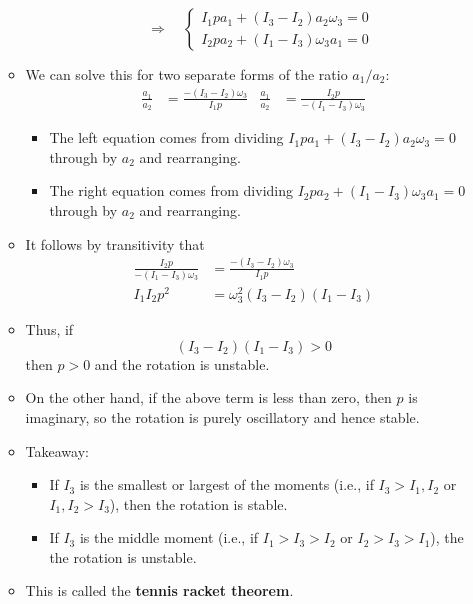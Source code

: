 \documentclass[../notes.tex]{subfiles}
\begin{document}
\begin{itemize}
\begin{itemize}
\begin{equation*}
            \quad\Longrightarrow\quad
            \begin{cases}
                I_1pa_1+(I_3-I_2)a_2\omega_3 = 0\\
                I_2pa_2+(I_1-I_3)\omega_3a_1 = 0
            \end{cases}
        \end{equation*}
        \item We can solve this for two separate forms of the ratio $a_1/a_2$:
        \begin{align*}
            \frac{a_1}{a_2} &= \frac{-(I_3-I_2)\omega_3}{I_1p}&
            \frac{a_1}{a_2} &= \frac{I_2p}{-(I_1-I_3)\omega_3}
        \end{align*}
        \begin{itemize}
            \item The left equation comes from dividing $I_1pa_1+(I_3-I_2)a_2\omega_3=0$ through by $a_2$ and rearranging.
            \item The right equation comes from dividing $I_2pa_2+(I_1-I_3)\omega_3a_1=0$ through by $a_2$ and rearranging.
        \end{itemize}
        \item It follows by transitivity that
        \begin{align*}
            \frac{I_2p}{-(I_1-I_3)\omega_3} &= \frac{-(I_3-I_2)\omega_3}{I_1p}\\
            I_1I_2p^2 &= \omega_3^2(I_3-I_2)(I_1-I_3)
        \end{align*}
        \item Thus, if
        \begin{equation*}
            (I_3-I_2)(I_1-I_3) > 0
        \end{equation*}
        then $p>0$ and the rotation is unstable.
        \item On the other hand, if the above term is less than zero, then $p$ is imaginary, so the rotation is purely oscillatory and hence stable.
        \item Takeaway:
        \begin{itemize}
            \item If $I_3$ is the smallest or largest of the moments (i.e., if $I_3>I_1,I_2$ or $I_1,I_2>I_3$), then the rotation is stable.
            \item If $I_3$ is the middle moment (i.e., if $I_1>I_3>I_2$ or $I_2>I_3>I_1$), the the rotation is unstable.
        \end{itemize}
        \item This is called the \textbf{tennis racket theorem}.

\end{itemize}
\end{itemize}
\end{document}
